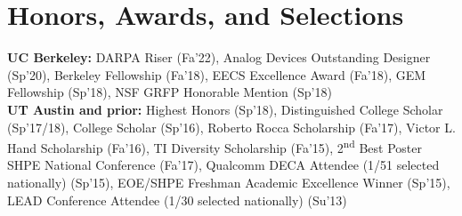 \documentclass[line]{res}
\begin{document}
\begin{resume}
\begin{multicols}{2}
\end{multicols}

\vspace{-7mm}


\section{\Large{Honors, Awards, and Selections}}
\label{sec:honors}
\vspace{2mm}

\textbf{UC Berkeley:} DARPA Riser (Fa'22), Analog Devices Outstanding Designer (Sp'20), Berkeley Fellowship (Fa'18), EECS Excellence Award (Fa'18), GEM Fellowship (Sp'18), NSF GRFP Honorable Mention (Sp'18) \\
\textbf{UT Austin and prior:} Highest Honors (Sp'18),
Distinguished College Scholar (Sp'17/18),
College Scholar (Sp'16),
Roberto Rocca Scholarship (Fa'17),
Victor L. Hand Scholarship (Fa'16),
TI Diversity Scholarship (Fa'15),
2\textsuperscript{nd} Best Poster SHPE National Conference (Fa'17),
Qualcomm DECA Attendee (1/51 selected nationally) (Sp'15),
EOE/SHPE Freshman Academic Excellence Winner (Sp'15),
LEAD Conference Attendee (1/30 selected nationally) (Su'13)

\end{resume}
\end{document}
